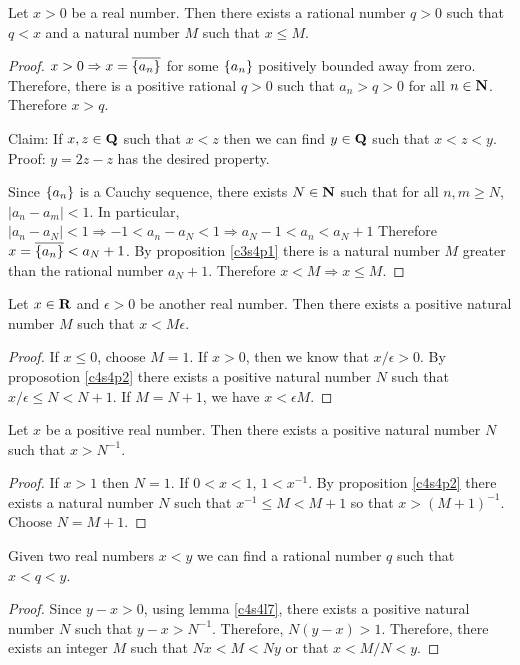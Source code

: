 \begin{prop}\label{c4s4p2}
Let $x > 0$ be a real number. Then there exists a rational number $q > 0$
such that $q < x$ and a natural number $M$ such that $x \le M$.
\end{prop}
\begin{proof}
$x > 0 \Rightarrow x = \overline{\{a_n\}}$ for some $\{a_n\}$ 
positively bounded away from zero. Therefore, there is a positive rational
$q > 0$ such that $a_n > q > 0$ for all $n \in \mathbf{N}$. Therefore $x > q$.

Claim: If $x, z \in \mathbf{Q}$ such that $x < z$ then we can find $y \in \mathbf{Q}$
such that $x < z < y$.
Proof: $y = 2z - z$ has the desired property.

Since $\{a_n\}$ is a Cauchy sequence, there exists $N \in \mathbf{N}$ such 
that for all $n, m \ge N$, $|a_n - a_m| < 1$. In particular, $|a_n - a_N|
< 1 \Rightarrow -1 < a_n - a_N < 1 \Rightarrow a_N - 1 < a_n < a_N + 1$
Therefore $x = \overline{\{a_n\}} < a_N + 1$. By proposition 
\ref{c3s4p1} there is a natural number $M$ greater than the rational number
$a_N + 1$. Therefore $x < M \Rightarrow x \le M$.
\end{proof}

\begin{prop}\label{c4s4p3}
Let $x \in \mathbf{R}$ and $\epsilon > 0$ be another real number. Then there 
exists a positive natural number $M$ such that $x < M\epsilon$.
\end{prop}
\begin{proof}
If $x \le 0$, choose $M = 1$. If $x > 0$, then we know that $x/\epsilon > 
0$. By proposotion \ref{c4s4p2} there exists a positive natural number 
$N$ such that $x/\epsilon \le N < N + 1$. If $M = N + 1$, we have $x < 
\epsilon M$.
\end{proof}

\begin{lem}\label{c4s4l7}
Let $x$ be a positive real number. Then there exists a positive natural
number $N$ such that $x > N^{-1}$.
\end{lem}
\begin{proof}
If $x > 1$ then $N = 1$. If $0 < x < 1$, $1 < x^{-1}$. By proposition 
\ref{c4s4p2} there exists a natural number $N$ such that $x^{-1} \le M <
M + 1$ so that $x > (M + 1)^{-1}$. Choose $N = M + 1$.
\end{proof}

\begin{prop}\label{c4s4p4}
Given two real numbers $x < y$ we can find a rational number $q$ such
that $x < q < y$.
\end{prop}
\begin{proof}
Since $y - x > 0$, using lemma \ref{c4s4l7}, there exists a positive
natural number $N$ such that $y - x > N^{-1}$. Therefore, $N(y - x) > 1$.
Therefore, there exists an integer $M$ such that $Nx < M < Ny$ or that
$x < M/N < y$.
\end{proof}

